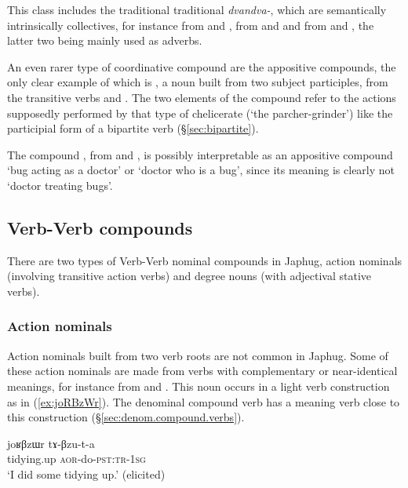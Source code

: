 This class includes the traditional traditional \textit{dvandva-}, which are semantically intrinsically collectives, for instance  from  and ,  from  and  and  from  and , the latter two being mainly used as adverbs.

An even rarer type of coordinative compound are the appositive compounds, the only clear example of which is , a noun built from two subject participles, from the transitive verbs  and . The two elements of the compound refer to the actions supposedly performed by that type of chelicerate (`the parcher-grinder') like the participial form of a bipartite verb (§\ref{sec:bipartite}).

The compound , from  and , is possibly interpretable as an appositive compound `bug acting as a doctor' or `doctor who is a bug', since its meaning is clearly not `doctor treating bugs'.

\subsection{Verb-Verb compounds} \label{sec.v.v.compounds}
There are two types of Verb-Verb nominal compounds in Japhug, action nominals (involving transitive action verbs) and degree nouns (with adjectival stative verbs).

\subsubsection{Action nominals} \label{sec.v.v.compounds.action}
Action nominals built from two verb roots are not common in Japhug. Some of these action nominals are made from verbs with complementary or near-identical meanings, for instance  from  and . This noun occurs in a light verb construction as in (\ref{ex:joRBzWr}). The denominal compound verb  has a meaning verb close to this construction (§\ref{sec:denom.compound.verbs}).

\begin{exe}
\ex \label{ex:joRBzWr}
 \gll joʁβzɯr tɤ-βzu-t-a \\
 tidying.up \textsc{aor}-do-\textsc{pst}:\textsc{tr}-\textsc{1sg} \\
 \glt `I did some tidying up.' (elicited)
\end{exe}

